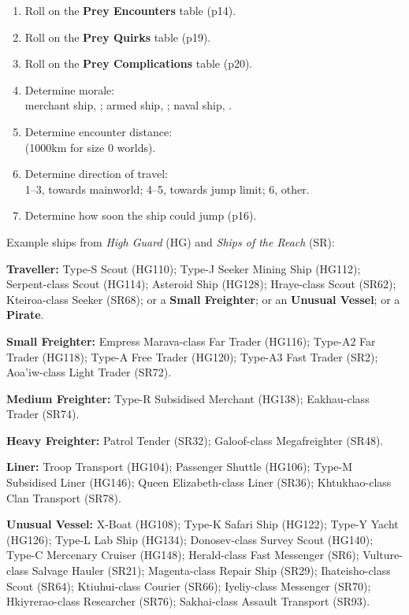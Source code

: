 \documentclass{cheatsheet}
\begin{document}
\begin{multicols}{2}
\begin{enumerate}
\item Roll on the \textbf{Prey Encounters} table (p14).
\item Roll on the \textbf{Prey Quirks} table (p19).
\item Roll on the \textbf{Prey Complications} table (p20).
\item Determine morale:\\
  merchant ship, ; armed ship, ; naval ship, .
\item Determine encounter distance:\\
   (1000km for size 0 worlds).
\item Determine direction of travel:\\
  1--3, towards mainworld; 4--5, towards jump limit; 6, other.
\item Determine how soon the ship could jump (p16).
\end{enumerate}

Example ships from \textit{High Guard} (HG) and \textit{Ships of the
  Reach} (SR):

\textbf{Traveller:} Type-S Scout (HG110); Type-J Seeker Mining Ship
(HG112); Serpent-class Scout (HG114); Asteroid Ship (HG128);
Hraye-class Scout (SR62); Kteiroa-class Seeker (SR68); or a
\textbf{Small Freighter}; or an \textbf{Unusual Vessel}; or a
\textbf{Pirate}.

\textbf{Small Freighter:} Empress Marava-class Far Trader (HG116);
Type-A2 Far Trader (HG118); Type-A Free Trader (HG120); Type-A3 Fast
Trader (SR2); Aoa'iw-class Light Trader (SR72).

\textbf{Medium Freighter:} Type-R Subsidised Merchant (HG138);
Eakhau-class Trader (SR74).

\textbf{Heavy Freighter:} Patrol Tender (SR32); Galoof-class
Megafreighter (SR48).

\textbf{Liner:} Troop Transport (HG104); Passenger Shuttle (HG106);
Type-M Subsidised Liner (HG146); Queen Elizabeth-class Liner (SR36);
Khtukhao-class Clan Transport (SR78).

\textbf{Unusual Vessel:} X-Boat (HG108); Type-K Safari Ship (HG122);
Type-Y Yacht (HG126); Type-L Lab Ship (HG134); Donosev-class Survey
Scout (HG140); Type-C Mercenary Cruiser (HG148); Herald-class Fast
Messenger (SR6); Vulture-class Salvage Hauler (SR21); Magenta-class
Repair Ship (SR29); Ihateisho-class Scout (SR64); Ktiuhui-class
Courier (SR66); Iyeliy-class Messenger (SR70); Hkiyrerao-class
Researcher (SR76); Sakhai-class Assault Transport (SR93).


\end{multicols}
\end{document}
